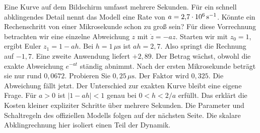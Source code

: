 Eine Kurve auf dem Bildschirm umfasst mehrere Sekunden. Für ein schnell abklingendes Detail nennt das Modell eine Rate von \(a=2{,}7\cdot10^6\,\mathrm{s^{-1}}\). Könnte ein Rechenschritt von einer Mikrosekunde schon zu groß sein? Für diese Vorrechnung betrachten wir eine einzelne Abweichung \(z\) mit \(\dot z=-az\).
Starten wir mit \(z_0=1\), ergibt Euler \(z_1=1-ah\). Bei \(h=1\,\mu\mathrm s\) ist \(ah=2{,}7\). Also springt die Rechnung auf \(-1{,}7\). Eine zweite Anwendung liefert \(+2{,}89\). Der Betrag wächst, obwohl die exakte Abweichung \(e^{-at}\) ständig abnimmt. Nach der ersten Mikrosekunde beträgt sie nur rund \(0{,}0672\).
Probieren Sie \(0{,}25\,\mu\mathrm s\). Der Faktor wird \(0{,}325\). Die Abweichung fällt jetzt. Der Unterschied zur exakten Kurve bleibt eine eigene Frage. Für \(a>0\) ist \(|1-ah|<1\) genau bei \(0<h<2/a\) erfüllt. Das erklärt die Kosten kleiner expliziter Schritte über mehrere Sekunden.
Die Parameter und Schaltregeln des offiziellen Modells folgen auf der nächsten Seite. Die skalare Abklingrechnung hier isoliert einen Teil der Dynamik.


